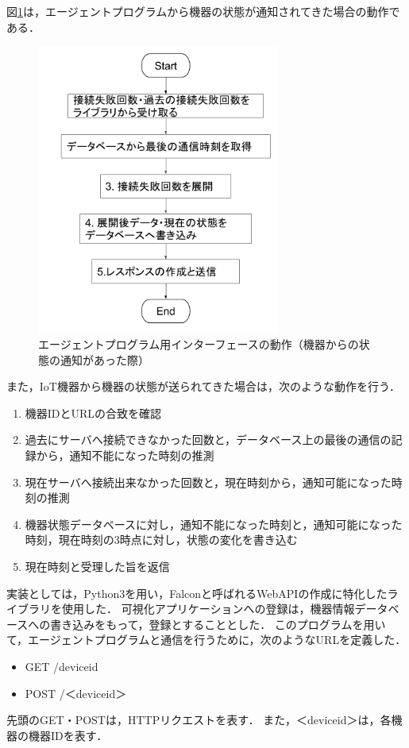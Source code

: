図\ref{fig:interface_flowB}は，エージェントプログラムから機器の状態が通知されてきた場合の動作である．
\begin{figure}[htbp]
\begin{center}
\includegraphics[width=8cm]{images/interface_flow2.png}
\caption{エージェントプログラム用インターフェースの動作（機器からの状態の通知があった際）}
\label{fig:interface_flowB}
\end{center}
\end{figure}

また，IoT機器から機器の状態が送られてきた場合は，次のような動作を行う．
\begin{enumerate}
\item 機器IDとURLの合致を確認
\item 過去にサーバへ接続できなかった回数と，データベース上の最後の通信の記録から，通知不能になった時刻の推測
\item 現在サーバへ接続出来なかった回数と，現在時刻から，通知可能になった時刻の推測
\item 機器状態データベースに対し，通知不能になった時刻と，通知可能になった時刻，現在時刻の3時点に対し，状態の変化を書き込む
\item 現在時刻と受理した旨を返信
\end{enumerate}

実装としては，Python3を用い，Falconと呼ばれるWebAPIの作成に特化したライブラリを使用した．
可視化アプリケーションへの登録は，機器情報データベースへの書き込みをもって，登録とすることとした．
このプログラムを用いて，エージェントプログラムと通信を行うために，次のようなURLを定義した．
\begin{itemize}
	\item GET /deviceid
	\item POST /＜deviceid＞
\end{itemize}
先頭のGET・POSTは，HTTPリクエストを表す．
また，＜deviceid＞は，各機器の機器IDを表す．



